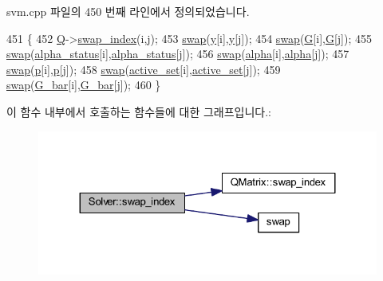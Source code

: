 svm.\+cpp 파일의 450 번째 라인에서 정의되었습니다.


\begin{DoxyCode}
451 \{
452     \hyperlink{class_solver_a2d3461718f0570bdc47f5dfb31d61e0a}{Q}->\hyperlink{class_q_matrix_acb4e256ebe3008dff0d4b5414102dbe7}{swap\_index}(i,j);
453     \hyperlink{svm_8cpp_a91e77fa16b1c9bbbf90f2eea392997b1}{swap}(\hyperlink{class_solver_a3acc1043d06dedf87f054ff3eea5c426}{y}[i],\hyperlink{class_solver_a3acc1043d06dedf87f054ff3eea5c426}{y}[j]);
454     \hyperlink{svm_8cpp_a91e77fa16b1c9bbbf90f2eea392997b1}{swap}(\hyperlink{class_solver_ad8ab27068f2e045591970aae1201afe9}{G}[i],\hyperlink{class_solver_ad8ab27068f2e045591970aae1201afe9}{G}[j]);
455     \hyperlink{svm_8cpp_a91e77fa16b1c9bbbf90f2eea392997b1}{swap}(\hyperlink{class_solver_a9fe653e04c43956d5fb86635651b0003}{alpha\_status}[i],\hyperlink{class_solver_a9fe653e04c43956d5fb86635651b0003}{alpha\_status}[j]);
456     \hyperlink{svm_8cpp_a91e77fa16b1c9bbbf90f2eea392997b1}{swap}(\hyperlink{class_solver_a00d7a7cefa2504d41c7db6cd7cc6b428}{alpha}[i],\hyperlink{class_solver_a00d7a7cefa2504d41c7db6cd7cc6b428}{alpha}[j]);
457     \hyperlink{svm_8cpp_a91e77fa16b1c9bbbf90f2eea392997b1}{swap}(\hyperlink{class_solver_a882cce072f56679880d409e3e73f7ae8}{p}[i],\hyperlink{class_solver_a882cce072f56679880d409e3e73f7ae8}{p}[j]);
458     \hyperlink{svm_8cpp_a91e77fa16b1c9bbbf90f2eea392997b1}{swap}(\hyperlink{class_solver_a6382277606a9b3df3d2f0ac947e1cde3}{active\_set}[i],\hyperlink{class_solver_a6382277606a9b3df3d2f0ac947e1cde3}{active\_set}[j]);
459     \hyperlink{svm_8cpp_a91e77fa16b1c9bbbf90f2eea392997b1}{swap}(\hyperlink{class_solver_a89e58cf39a0415c9032b8ec2f4575dcc}{G\_bar}[i],\hyperlink{class_solver_a89e58cf39a0415c9032b8ec2f4575dcc}{G\_bar}[j]);
460 \}
\end{DoxyCode}


이 함수 내부에서 호출하는 함수들에 대한 그래프입니다.\+:
\nopagebreak
\begin{figure}[H]
\begin{center}
\leavevmode
\includegraphics[width=324pt]{class_solver_a043f498c1dda0122859d03f9cd07dc08_cgraph}
\end{center}
\end{figure}




